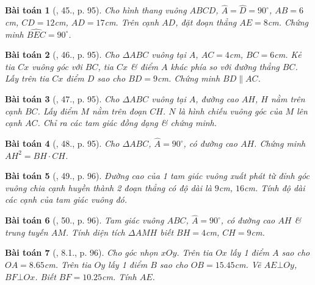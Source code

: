 \documentclass{article}
\newtheorem{baitoan}{Bài toán}
\begin{document}
\begin{baitoan}[\cite{SBT_Toan_8_tap_2}, 45., p. 95]
	Cho hình thang vuông $ABCD$, $\widehat{A} = \widehat{D} = 90^\circ$, $AB = 6$\emph{cm}, $CD = 12$\emph{cm}, $AD = 17$\emph{cm}. Trên cạnh $AD$, đặt đoạn thẳng $AE = 8$\emph{cm}. Chứng minh $\widehat{BEC} = 90^\circ$.
\end{baitoan}

\begin{baitoan}[\cite{SBT_Toan_8_tap_2}, 46., p. 95]
	Cho $\Delta ABC$ vuông tại $A$, $AC = 4$\emph{cm}, $BC = 6$\emph{cm}. Kẻ tia $Cx$ vuông góc với $BC$, tia $Cx$ \& điểm $A$ khác phía so với đường thẳng $BC$. Lấy trên tia $Cx$ điểm $D$ sao cho $BD = 9$\emph{cm}. Chứng minh $BD\parallel AC$.
\end{baitoan}

\begin{baitoan}[\cite{SBT_Toan_8_tap_2}, 47., p. 95]
	Cho $\Delta ABC$ vuông tại $A$, đường cao $AH$, $H$ nằm trên cạnh $BC$. Lấy điểm $M$ nằm trên đoạn $CH$. $N$ là hình chiếu vuông góc của $M$ lên cạnh $AC$. Chỉ ra các tam giác đồng dạng \& chứng minh.
\end{baitoan}

\begin{baitoan}[\cite{SBT_Toan_8_tap_2}, 48., p. 95]
	Cho $\Delta ABC$, $\widehat{A} = 90^\circ$, có đường cao $AH$. Chứng minh $AH^2 = BH\cdot CH$.
\end{baitoan}

\begin{baitoan}[\cite{SBT_Toan_8_tap_2}, 49., p. 96]
	Đường cao của 1 tam giác vuông xuất phát từ đỉnh góc vuông chia cạnh huyền thành 2 đoạn thẳng có độ dài là $9$\emph{cm}, $16$\emph{cm}. Tính độ dài các cạnh của tam giác vuông đó.
\end{baitoan}

\begin{baitoan}[\cite{SBT_Toan_8_tap_2}, 50., p. 96]
	Tam giác vuông $ABC$, $\widehat{A} = 90^\circ$, có đường cao $AH$ \& trung tuyến $AM$. Tính diện tích $\Delta AMH$ biết $BH = 4$\emph{cm}, $CH = 9$\emph{cm}.
\end{baitoan}

\begin{baitoan}[\cite{SBT_Toan_8_tap_2}, 8.1., p. 96]
	Cho góc nhọn $xOy$. Trên tia $Ox$ lấy 1 điểm $A$ sao cho $OA = 8.65$\emph{cm}. Trên tia $Oy$ lấy 1 điểm $B$ sao cho $OB = 15.45$\emph{cm}. Vẽ $AE\bot Oy$, $BF\bot Ox$. Biết $BF = 10.25$\emph{cm}. Tính $AE$.
\end{baitoan}
\end{document}
